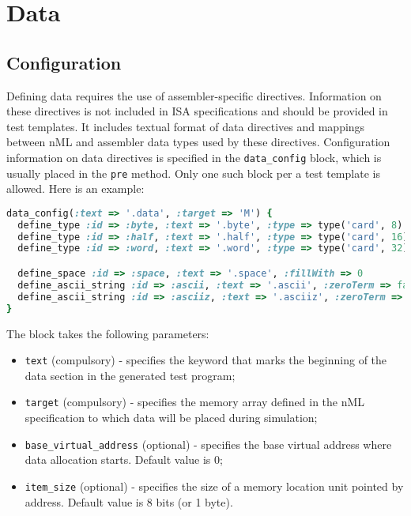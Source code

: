 \documentclass[oneside,final,12pt]{extreport}
\begin{document}

\section{Data}

\subsection{Configuration}

Defining data requires the use of assembler-specific directives. Information on
these directives is not included in ISA specifications and should be provided in test
templates. It includes textual format of data directives and mappings between nML and
assembler data types used by these directives. Configuration information on data
directives is specified in the \texttt{data{\_}config} block, which is usually placed
in the \texttt{pre} method. Only one such block per a test template is allowed.
Here is an example:

\begin{lstlisting}[language=ruby]
data_config(:text => '.data', :target => 'M') {
  define_type :id => :byte, :text => '.byte', :type => type('card', 8)
  define_type :id => :half, :text => '.half', :type => type('card', 16)
  define_type :id => :word, :text => '.word', :type => type('card', 32)

  define_space :id => :space, :text => '.space', :fillWith => 0
  define_ascii_string :id => :ascii, :text => '.ascii', :zeroTerm => false
  define_ascii_string :id => :asciiz, :text => '.asciiz', :zeroTerm => true
}
\end{lstlisting}

The block takes the following parameters:

\begin{itemize}
  \item \texttt{text} (compulsory) - specifies the keyword that marks the beginning of
        the data section in the generated test program;

  \item \texttt{target} (compulsory) - specifies the memory array defined in the nML
        specification to which data will be placed during simulation;

  \label{base_virtual_address}
  \item \texttt{base{\_}virtual{\_}address} (optional) - specifies the base virtual
        address where data allocation starts. Default value is 0;

  \item \texttt{item{\_}size} (optional) - specifies the size of a memory location unit
        pointed by address. Default value is 8 bits (or 1 byte).
\end{itemize}
\end{document}
